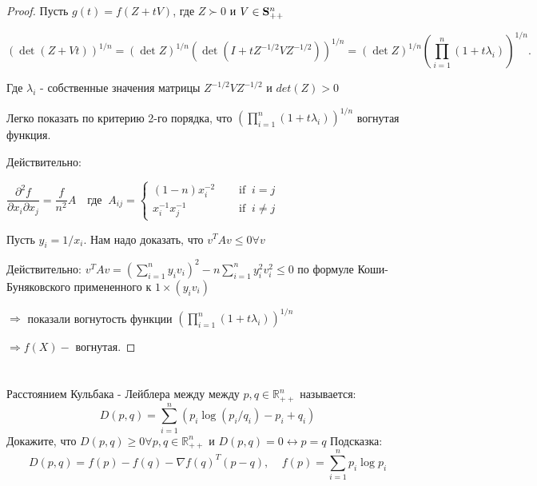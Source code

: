 \documentclass[a4paper,12pt]{article}
\newcommand{\p}{\partial}
\newcommand{\dfr}{\dfrac}
\newcommand{\la}{\lambda}
\begin{document}
\subsection{}

\begin{proof}
Пусть $g(t) =  f(Z + tV)$, где  $Z\succ 0$ и $V \in {\bf S}^n_{++} $

$$
(\det (Z + Vt))^{1/n} = (\det Z)^{1/n} (\det (I + tZ^{-1/2}VZ^{-1/2}))^{1/n} = (\det Z)^{1/n} \left(\prod\limits_{i=1}^n (1 + t \lambda_i)\right)^{1/n}.
$$

Где $\la_i$ - собственные значения матрицы $Z^{-1/2}VZ^{-1/2}$ и $det(Z) > 0$

Легко показать по критерию 2-го порядка, что $\left(\prod\limits_{i=1}^n (1 + t \lambda_i)\right)^{1/n}$ вогнутая функция.

Действительно:

$ \dfr{\p^2 f}{\p x_i \p x_j} =\dfrac{f}{n^2}A \quad \text{где  } \ A_{ij}= \begin{cases}(1-n)x_i^{-2} \quad &\text{ if }\ i=j \\
x_i^{-1}x_j^{-1} \quad &\text{ if }\ i\ne j \end{cases} $

Пусть $y_i = 1/x_i$. Нам надо доказать, что $v^TAv \le 0 \forall v$

Действительно:
$v^TAv=\left(\sum_{i=1}^n y_iv_i\right)^2-n \sum_{i=1}^n y_i^2 v_i^2 \le 0$ по формуле Коши-Буняковского примененного к $1\times (y_iv_i)$

$\Rightarrow $ показали вогнутость функции $\left(\prod\limits_{i=1}^n (1 + t \lambda_i)\right)^{1/n}$

$\Rightarrow f(X) - $ вогнутая.

\end{proof}
\section{}

Расстоянием Кульбака - Лейблера между между $p,q \in \mathbb{R}^n_{++}$ называется:
 $$
 D(p,q) = \sum\limits_{i=1}^n (p_i \log(p_i/q_i) - p_i + q_i)
 $$
 Докажите, что $D(p,q) \geq 0 \forall p,q \in \mathbb{R}^n_{++}$ и $D(p,q) = 0 \leftrightarrow p = q$  
 Подсказка:  $$
 D(p,q) = f(p) - f(q) - \nabla f(q)^T(p-q), \;\;\;\; f(p) = \sum\limits_{i=1}^n p_i \log p_i
 $$
\end{document}
